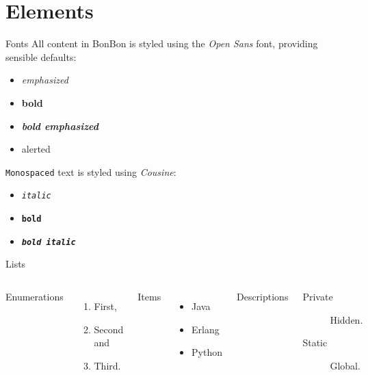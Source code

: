 \documentclass{beamer} %
\newcommand*{\bonbon}{BonBon\xspace}
\begin{document}
\section{Elements}

\begin{frame}{Fonts}
  All content in \bonbon is styled using the \emph{Open Sans} font, providing
  sensible defaults:
  \begin{itemize}
    \item \emph{emphasized}
    \item \textbf{bold}
    \item \textbf{\emph{bold emphasized}}
    \item \alert{alerted}
  \end{itemize}

  \texttt{Monospaced} text is styled using \emph{Cousine}:
  \begin{itemize}
    \item \texttt{\textit{italic}}
    \item \texttt{\textbf{bold}}
    \item \texttt{\textbf{\textit{bold italic}}}
  \end{itemize}
\end{frame}

\begin{frame}{Lists}
  \begin{columns}[T, onlytextwidth]
    Enumerations
    \begin{enumerate}
      \item First,
      \item Second and
      \item Third.
    \end{enumerate}

      Items
      \begin{itemize}
        \item Java
        \item Erlang
        \item Python
      \end{itemize}

      Descriptions
      \begin{description}
        \item[Private] Hidden.
        \item[Static] Global.
      \end{description}
  \end{columns}
\end{frame}
\end{document}

